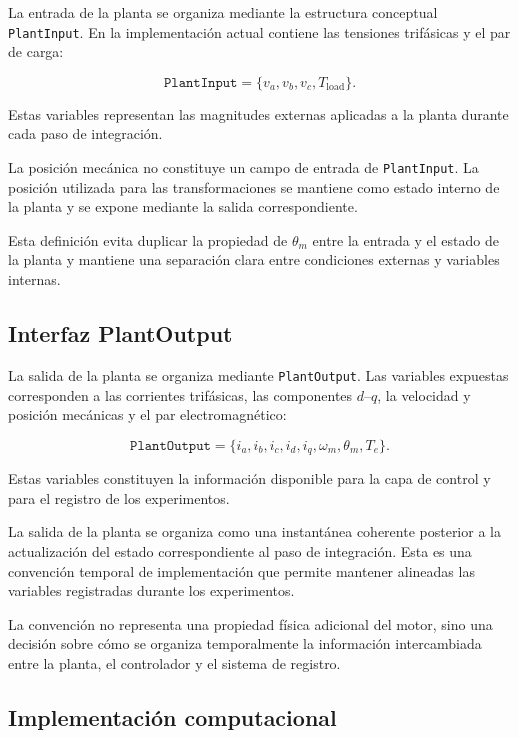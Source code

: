 La entrada de la planta se organiza mediante la estructura conceptual \texttt{PlantInput}. En la implementación actual contiene las tensiones trifásicas y el par de carga:

\begin{equation}
\texttt{PlantInput}
=
\{
v_a,v_b,v_c,T_{\mathrm{load}}
\}.
\end{equation}

Estas variables representan las magnitudes externas aplicadas a la planta durante cada paso de integración.

La posición mecánica no constituye un campo de entrada de \texttt{PlantInput}. La posición utilizada para las transformaciones se mantiene como estado interno de la planta y se expone mediante la salida correspondiente.

Esta definición evita duplicar la propiedad de $\theta_m$ entre la entrada y el estado de la planta y mantiene una separación clara entre condiciones externas y variables internas.

\subsection{Interfaz PlantOutput}

La salida de la planta se organiza mediante \texttt{PlantOutput}. Las variables expuestas corresponden a las corrientes trifásicas, las componentes $d$--$q$, la velocidad y posición mecánicas y el par electromagnético:

\begin{equation}
\texttt{PlantOutput}
=
\{
i_a,i_b,i_c,
i_d,i_q,
\omega_m,\theta_m,T_e
\}.
\end{equation}

Estas variables constituyen la información disponible para la capa de control y para el registro de los experimentos.

La salida de la planta se organiza como una instantánea coherente posterior a la actualización del estado correspondiente al paso de integración. Esta es una convención temporal de implementación que permite mantener alineadas las variables registradas durante los experimentos.

La convención no representa una propiedad física adicional del motor, sino una decisión sobre cómo se organiza temporalmente la información intercambiada entre la planta, el controlador y el sistema de registro.

\subsection{Implementación computacional}

